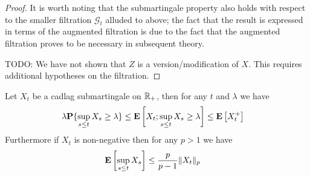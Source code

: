 \begin{proof}
It is worth noting that the submartingale property also holds with
respect to the smaller filtration $\mathcal{G}_t$ alluded to above; the fact that the result is
expressed in terms of the augmented filtration is due to the fact that
the augmented filtration proves to be necessary in subsequent theory.

TODO: We have not shown that $Z$ is a version/modification of $X$.
This requires additional hypotheses on the filtration.
\end{proof}

\begin{lem}\label{DoobMaximalInequalityContinuous}Let $X_t$ be a
  cadlag submartingale on $\mathbb{R}_+$, then for any $t$ and $\lambda$ we have
\begin{align*}
\lambda \textbf{P}\{\sup_{s \leq t} X_s \geq \lambda\} &\leq
\textbf{E}\left[X_t ; \sup_{s \leq t} X_s \geq \lambda\right] \leq \textbf{E}\left[X_t^+\right]
\end{align*}
Furthermore if $X_t$ is non-negative then for any $p > 1$ we have
\begin{align*}
\textbf{E}\left[\sup_{s \leq t} X_s\right] &\leq \frac{p}{p-1}\lVert X_t \rVert_p
\end{align*}
\end{lem}
